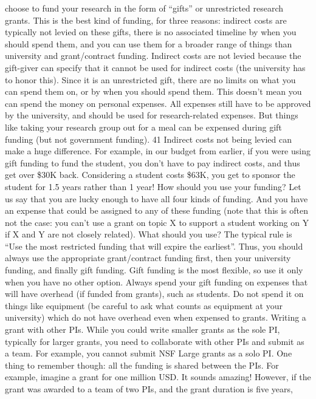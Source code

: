 \documentclass[oneside,11pt]{memoir}
\begin{document}
choose to fund your research in the form of “gifts” or unrestricted research grants. This is the
best kind of funding, for three reasons: indirect costs are typically not levied on these gifts, there
is no associated timeline by when you should spend them, and you can use them for a broader
range of things than university and grant/contract funding.
Indirect costs are not levied because the gift-giver can specify that it cannot be used for indirect
costs (the university has to honor this). Since it is an unrestricted gift, there are no limits on
what you can spend them on, or by when you should spend them. This doesn’t mean you can
spend the money on personal expenses. All expenses still have to be approved by the university,
and should be used for research-related expenses. But things like taking your research group
out for a meal can be expensed during gift funding (but not government funding).
41
Indirect costs not being levied can make a huge difference. For example, in our budget from
earlier, if you were using gift funding to fund the student, you don’t have to pay indirect costs,
and thus get over \$30K back. Considering a student costs \$63K, you get to sponsor the student
for 1.5 years rather than 1 year!
How should you use your funding? Let us say that you are lucky enough to have all four kinds of
funding. And you have an expense that could be assigned to any of these funding (note that this
is often not the case: you can’t use a grant on topic X to support a student working on Y if X and
Y are not closely related). What should you use?
The typical rule is “Use the most restricted funding that will expire the earliest”. Thus, you should
always use the appropriate grant/contract funding first, then your university funding, and finally
gift funding. Gift funding is the most flexible, so use it only when you have no other option.
Always spend your gift funding on expenses that will have overhead (if funded from grants),
such as students. Do not spend it on things like equipment (be careful to ask what counts as
equipment at your university) which do not have overhead even when expensed to grants.
Writing a grant with other PIs. While you could write smaller grants as the sole PI, typically for
larger grants, you need to collaborate with other PIs and submit as a team. For example, you
cannot submit NSF Large grants as a solo PI. One thing to remember though: all the funding is
shared between the PIs. For example, imagine a grant for one million USD. It sounds amazing!
However, if the grant was awarded to a team of two PIs, and the grant duration is five years,
\end{document}
